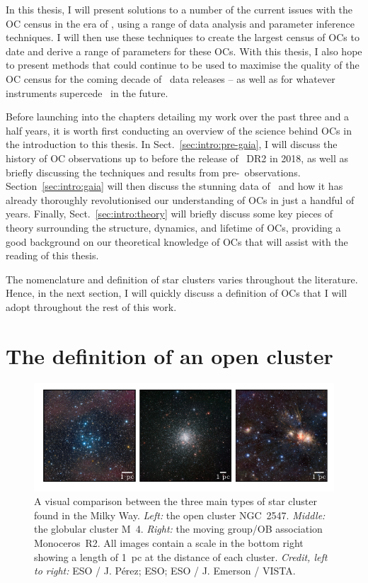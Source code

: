 In this thesis, I will present solutions to a number of the current issues with the OC census in the era of \gaia, using a range of data analysis and parameter inference techniques. I will then use these techniques to create the largest census of OCs to date and derive a range of parameters for these OCs. With this thesis, I also hope to present methods that could continue to be used to maximise the quality of the OC census for the coming decade of \gaia\ data releases -- as well as for whatever instruments supercede \gaia\ in the future.

Before launching into the chapters detailing my work over the past three and a half years, it is worth first conducting an overview of the science behind OCs in the introduction to this thesis. In Sect.~\ref{sec:intro:pre-gaia}, I will discuss the history of OC observations up to before the release of \gaia\ DR2 in 2018, as well as briefly discussing the techniques and results from pre-\gaia\ observations. Section~\ref{sec:intro:gaia} will then discuss the stunning data of \gaia\ and how it has already thoroughly revolutionised our understanding of OCs in just a handful of years. Finally, Sect.~\ref{sec:intro:theory} will briefly discuss some key pieces of theory surrounding the structure, dynamics, and lifetime of OCs, providing a good background on our theoretical knowledge of OCs that will assist with the reading of this thesis.

The nomenclature and definition of star clusters varies throughout the literature. Hence, in the next section, I will quickly discuss a definition of OCs that I will adopt throughout the rest of this work.


\section{The definition of an open cluster}
\label{sec:intro:definition}

\begin{figure}[tb]
	\includegraphics[width=\textwidth]{fig/c1/oc_gc_mg_comparison.pdf}
	\caption[A visual comparison between the three main types of star cluster found in the Milky Way]{A visual comparison between the three main types of star cluster found in the Milky Way. \emph{Left:} the open cluster NGC~2547. \emph{Middle:} the globular cluster M~4. \emph{Right:} the moving group/OB association Monoceros~R2. All images contain a scale in the bottom right showing a length of 1~pc at the distance of each cluster. \emph{Credit, left to right:} ESO / J. Pérez; ESO; ESO / J. Emerson / VISTA. }
	\label{fig:intro:definition:comparison}
\end{figure}

